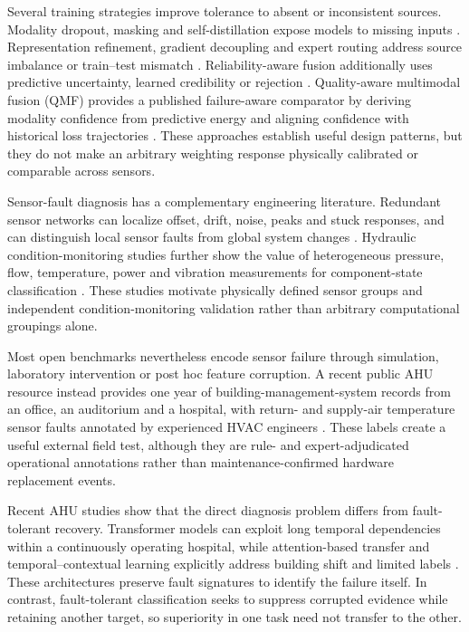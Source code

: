 \documentclass[11pt]{article}
\begin{document}
Several training strategies improve tolerance to absent or inconsistent sources. Modality dropout, masking and self-distillation expose models to missing inputs \citep{neverova2016moddrop,li2024umdf,woo2023practices}. Representation refinement, gradient decoupling and expert routing address source imbalance or train--test mismatch \citep{wang2024gradient,mckinzie2023mismatch,yao2024drfuse,huang2025mgr}. Reliability-aware fusion additionally uses predictive uncertainty, learned credibility or rejection \citep{gao2024aleatoric,cho2025cocoon,park2025mome,sidheekh2025credibility,liu2025rejection,rabanser2025selective}. Quality-aware multimodal fusion (QMF) provides a published failure-aware comparator by deriving modality confidence from predictive energy and aligning confidence with historical loss trajectories \citep{zhang2023qmf}. These approaches establish useful design patterns, but they do not make an arbitrary weighting response physically calibrated or comparable across sensors.

Sensor-fault diagnosis has a complementary engineering literature. Redundant sensor networks can localize offset, drift, noise, peaks and stuck responses, and can distinguish local sensor faults from global system changes \citep{kullaa2011distinguishing,kullaa2013sensor,helwig2015sensorfault}. Hydraulic condition-monitoring studies further show the value of heterogeneous pressure, flow, temperature, power and vibration measurements for component-state classification \citep{helwig2015condition,ma2021multirate,keleko2023hydraulic,yildirim2025hydraulic}. These studies motivate physically defined sensor groups and independent condition-monitoring validation rather than arbitrary computational groupings alone.

Most open benchmarks nevertheless encode sensor failure through simulation, laboratory intervention or post hoc feature corruption. A recent public AHU resource instead provides one year of building-management-system records from an office, an auditorium and a hospital, with return- and supply-air temperature sensor faults annotated by experienced HVAC engineers \citep{wang2025ahuoperational,wang2024ahudataset}. These labels create a useful external field test, although they are rule- and expert-adjudicated operational annotations rather than maintenance-confirmed hardware replacement events.

Recent AHU studies show that the direct diagnosis problem differs from fault-tolerant recovery. Transformer models can exploit long temporal dependencies within a continuously operating hospital, while attention-based transfer and temporal--contextual learning explicitly address building shift and limited labels \citep{wang2025ahutransformer,feng2024attention,wang2026temporal}. These architectures preserve fault signatures to identify the failure itself. In contrast, fault-tolerant classification seeks to suppress corrupted evidence while retaining another target, so superiority in one task need not transfer to the other.
\end{document}
